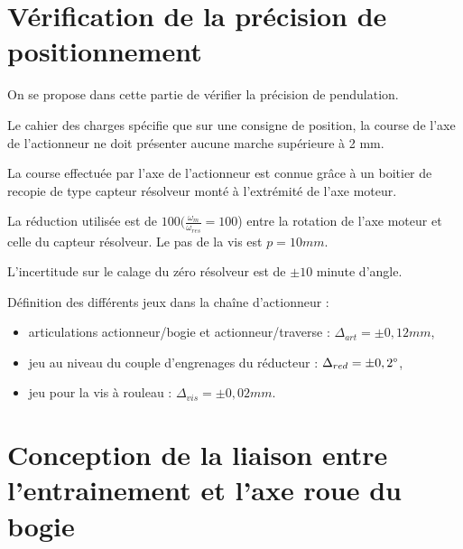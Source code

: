 
\section{Vérification de la précision de positionnement}

On se propose dans cette partie de vérifier la précision de pendulation.

Le cahier des charges spécifie que sur une consigne de position, la course de l'axe de l'actionneur ne doit présenter aucune \og marche \fg supérieure à 2 mm.

La course effectuée par l'axe de l'actionneur est connue grâce à un boitier de recopie de type capteur résolveur monté à l'extrémité de l'axe moteur.

La réduction utilisée est de $100(\frac{\omega_m}{\omega_{res}}=100$) entre la rotation de l'axe moteur et celle du capteur résolveur. Le pas de la vis est $p=10mm$.



L'incertitude sur le calage du zéro résolveur est de $\pm10$ minute d'angle.

Définition des différents jeux dans la chaîne d'actionneur :
\begin{itemize}
 \item articulations actionneur/bogie et actionneur/traverse : $\Delta_{art}=\pm0,12mm$,
 \item jeu au niveau du couple d'engrenages du réducteur : $\Delta_{red}=\pm0,2\degree$,
 \item jeu pour la vis à rouleau : $\Delta_{vis}=\pm0,02mm$.
\end{itemize}



\section{Conception de la liaison entre l'entrainement et l'axe roue du bogie}

